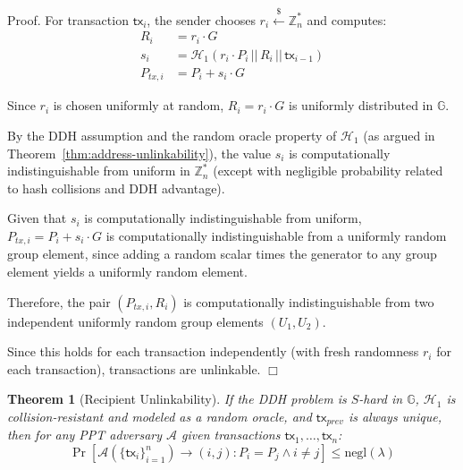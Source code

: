 \documentclass{article}
\newtheorem{theorem}{Theorem}[section]
\newenvironment{proof}{\textsf{Proof}.}{\hfill$\Box$}
\begin{document}
\begin{proof}
For transaction $\mathsf{tx}_i$, the sender chooses $r_i \stackrel{\$}{\leftarrow} \mathbb{Z}_n^*$ and computes:
\begin{align*}
R_i &= r_i \cdot G \\
s_i &= \mathcal{H}_1(r_i \cdot P_i \,||\, R_i \,||\, \mathsf{tx}_{i-1}) \\
P_{tx,i} &= P_i + s_i \cdot G
\end{align*}

Since $r_i$ is chosen uniformly at random, $R_i = r_i \cdot G$ is uniformly distributed in $\mathbb{G}$.

By the DDH assumption and the random oracle property of $\mathcal{H}_1$ (as argued in Theorem~\ref{thm:address-unlinkability}), the value $s_i$ is computationally indistinguishable from uniform in $\mathbb{Z}_n^*$ (except with negligible probability related to hash collisions and DDH advantage).

Given that $s_i$ is computationally indistinguishable from uniform, $P_{tx,i} = P_i + s_i \cdot G$ is computationally indistinguishable from a uniformly random group element, since adding a random scalar times the generator to any group element yields a uniformly random element.

Therefore, the pair $(P_{tx,i}, R_i)$ is computationally indistinguishable from two independent uniformly random group elements $(U_1, U_2)$.

Since this holds for each transaction independently (with fresh randomness $r_i$ for each transaction), transactions are unlinkable.
\end{proof}

\begin{theorem}[Recipient Unlinkability]
\label{thm:recipient-unlinkability}
If the DDH problem is $S$-hard in $\mathbb{G}$, $\mathcal{H}_1$ is collision-resistant and modeled as a random oracle, and $\mathsf{tx}_{prev}$ is always unique, then for any PPT adversary $\mathcal{A}$ given transactions $\mathsf{tx}_1, \ldots, \mathsf{tx}_n$:
$$\Pr\left[\mathcal{A}(\{\mathsf{tx}_i\}_{i=1}^n) \rightarrow (i,j) : P_i = P_j \wedge i \neq j\right] \leq \text{negl}(\lambda)$$
\end{theorem}
\end{document}
